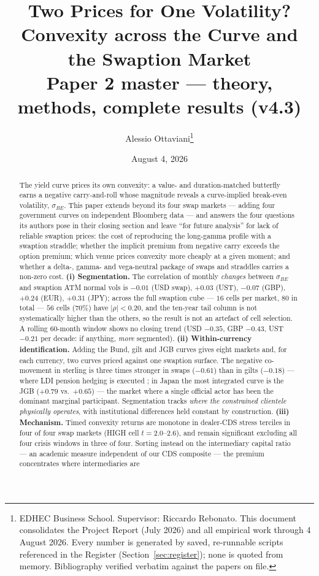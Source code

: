 \documentclass[11pt]{article}
\title{Two Prices for One Volatility?\\ Convexity across the Curve and the Swaption Market\\[4pt]
\large Paper 2 master --- theory, methods, complete results (v4.3)}
\author{Alessio Ottaviani\thanks{EDHEC Business School. Supervisor: Riccardo Rebonato. This document
consolidates the Project Report (July 2026) and all empirical work through 4 August 2026. Every number
is generated by saved, re-runnable scripts referenced in the Register (Section~\ref{sec:register});
none is quoted from memory. Bibliography verified verbatim against the papers on file.}}
\date{August 4, 2026}
\newcommand{\sBE}{\sigma_{BE}}
\begin{document}
\maketitle

\begin{abstract}
\noindent The yield curve prices its own convexity: a value- and duration-matched butterfly earns a
negative carry-and-roll whose magnitude reveals a curve-implied break-even volatility, $\sBE$. This
paper extends \citet{rr2021} beyond its four swap markets --- adding four government curves on
independent Bloomberg data --- and answers the four questions its authors
pose in their closing section and leave ``for future analysis'' for lack of reliable swaption prices:
the cost of reproducing the long-gamma profile with a swaption straddle; whether the implicit premium
from negative carry exceeds the option premium; which venue prices convexity more cheaply at a given
moment; and whether a delta-, gamma- and vega-neutral package of swaps and straddles carries a
non-zero cost. \textbf{(i) Segmentation.} The correlation of monthly \emph{changes} between $\sBE$ and
swaption ATM normal vols is $-0.01$ (USD swap), $+0.03$ (UST), $-0.07$ (GBP), $+0.24$ (EUR), $+0.31$
(JPY); across the full swaption cube --- $16$ cells per market, $80$ in total --- $56$ cells ($70\%$)
have $|\rho|<0.20$, and the ten-year tail column is not systematically higher than the others, so the
result is not an artefact of cell selection. A rolling 60-month window shows no closing trend
(USD $-0.35$, GBP $-0.43$, UST $-0.21$ per decade: if anything, \emph{more} segmented).
\textbf{(ii) Within-currency identification.} Adding the Bund, gilt and JGB curves gives eight markets
and, for each currency, two curves priced against one swaption surface. The negative co-movement in
sterling is three times stronger in swaps ($-0.61$) than in gilts ($-0.18$) --- where LDI pension
hedging is executed \citep{ks2023}; in Japan the most integrated curve is the JGB ($+0.79$ vs.\ $+0.65$)
--- the market where a single official actor has been the dominant marginal participant. Segmentation tracks \emph{where the constrained
clientele physically operates}, with institutional differences held constant by construction.
\textbf{(iii) Mechanism.} Timed convexity returns are monotone in dealer-CDS stress terciles in four
of four swap markets (HIGH cell $t=2.0$--$2.6$), and remain significant excluding all four crisis
windows in three of four. Sorting instead on the \citet{hkm2017} intermediary capital ratio --- an
academic measure independent of our CDS composite --- the premium concentrates where intermediaries are

\end{abstract}
\end{document}
